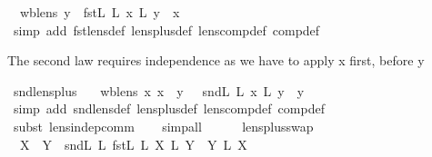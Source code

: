 \begin{isabellebody}
\ \ {\isachardoublequoteopen}wb{\isacharunderscore}lens\ y\ {\isasymLongrightarrow}\ fst\isactrlsub L\ {\isacharsemicolon}\isactrlsub L\ {\isacharparenleft}x\ {\isacharplus}\isactrlsub L\ y{\isacharparenright}\ {\isacharequal}\ x{\isachardoublequoteclose}\isanewline
%
\isadelimproof
\ \ %
\endisadelimproof
%
\isatagproof
{}\isamarkupfalse%
\ {\isacharparenleft}simp\ add{\isacharcolon}\ fst{\isacharunderscore}lens{\isacharunderscore}def\ lens{\isacharunderscore}plus{\isacharunderscore}def\ lens{\isacharunderscore}comp{\isacharunderscore}def\ comp{\isacharunderscore}def{\isacharparenright}%
\endisatagproof
{\isafoldproof}%
%
\isadelimproof
%
\endisadelimproof
%
\begin{isamarkuptext}%
The second law requires independence as we have to apply x first, before y%
\end{isamarkuptext}\isamarkuptrue%
\isamarkupfalse%
\ snd{\isacharunderscore}lens{\isacharunderscore}plus{\isacharcolon}\isanewline
\ \ {\isachardoublequoteopen}{\isasymlbrakk}\ wb{\isacharunderscore}lens\ x{\isacharsemicolon}\ x\ {\isasymbowtie}\ y\ {\isasymrbrakk}\ {\isasymLongrightarrow}\ snd\isactrlsub L\ {\isacharsemicolon}\isactrlsub L\ {\isacharparenleft}x\ {\isacharplus}\isactrlsub L\ y{\isacharparenright}\ {\isacharequal}\ y{\isachardoublequoteclose}\isanewline
%
\isadelimproof
\ \ %
\endisadelimproof
%
\isatagproof
{}\isamarkupfalse%
\ {\isacharparenleft}simp\ add{\isacharcolon}\ snd{\isacharunderscore}lens{\isacharunderscore}def\ lens{\isacharunderscore}plus{\isacharunderscore}def\ lens{\isacharunderscore}comp{\isacharunderscore}def\ comp{\isacharunderscore}def{\isacharparenright}\isanewline
\ \ \isamarkupfalse%
\ {\isacharparenleft}subst\ lens{\isacharunderscore}indep{\isacharunderscore}comm{\isacharparenright}\isanewline
\ \ \isamarkupfalse%
\ {\isacharparenleft}simp{\isacharunderscore}all{\isacharparenright}\isanewline
{}\isamarkupfalse%
%
\endisatagproof
{\isafoldproof}%
%
\isadelimproof
\isanewline
%
\endisadelimproof
\ \ \ \ \isanewline
{}\isamarkupfalse%
\ lens{\isacharunderscore}plus{\isacharunderscore}swap{\isacharcolon}\isanewline
\ \ {\isachardoublequoteopen}X\ {\isasymbowtie}\ Y\ {\isasymLongrightarrow}\ {\isacharparenleft}snd\isactrlsub L\ {\isacharplus}\isactrlsub L\ fst\isactrlsub L{\isacharparenright}\ {\isacharsemicolon}\isactrlsub L\ {\isacharparenleft}X\ {\isacharplus}\isactrlsub L\ Y{\isacharparenright}\ {\isacharequal}\ {\isacharparenleft}Y\ {\isacharplus}\isactrlsub L\ X{\isacharparenright}{\isachardoublequoteclose}\isanewline

\end{isabellebody}
